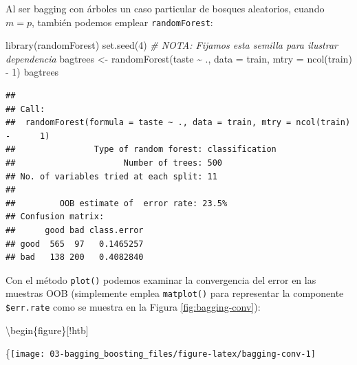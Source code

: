 \documentclass[
  spanish,
]{book}
\newenvironment{Shaded}{\begin{snugshade}}{\end{snugshade}}
\newcommand{\AttributeTok}[1]{\textcolor[rgb]{0.77,0.63,0.00}{#1}}
\newcommand{\CommentTok}[1]{\textcolor[rgb]{0.56,0.35,0.01}{\textit{#1}}}
\newcommand{\DecValTok}[1]{\textcolor[rgb]{0.00,0.00,0.81}{#1}}
\newcommand{\FunctionTok}[1]{\textcolor[rgb]{0.00,0.00,0.00}{#1}}
\newcommand{\NormalTok}[1]{#1}
\newcommand{\OtherTok}[1]{\textcolor[rgb]{0.56,0.35,0.01}{#1}}
\newcommand{\SpecialCharTok}[1]{\textcolor[rgb]{0.00,0.00,0.00}{#1}}
\newcommand{\StringTok}[1]{\textcolor[rgb]{0.31,0.60,0.02}{#1}}
\theoremstyle{break}
\theoremstyle{definition}
\theoremstyle{definition}
\theoremstyle{definition}
\theoremstyle{definition}
\theoremstyle{remark}
\begin{document}
Al ser bagging con árboles un caso particular de bosques aleatorios, cuando \(m = p\), también podemos emplear \texttt{randomForest}:

\begin{Shaded}
\begin{Highlighting}[]
\FunctionTok{library}\NormalTok{(randomForest)}
\FunctionTok{set.seed}\NormalTok{(}\DecValTok{4}\NormalTok{) }\CommentTok{\# NOTA: Fijamos esta semilla para ilustrar dependencia}
\NormalTok{bagtrees }\OtherTok{\textless{}{-}} \FunctionTok{randomForest}\NormalTok{(taste }\SpecialCharTok{\textasciitilde{}}\NormalTok{ ., }\AttributeTok{data =}\NormalTok{ train, }\AttributeTok{mtry =} \FunctionTok{ncol}\NormalTok{(train) }\SpecialCharTok{{-}} \DecValTok{1}\NormalTok{)}
\NormalTok{bagtrees}
\end{Highlighting}
\end{Shaded}

\begin{verbatim}
## 
## Call:
##  randomForest(formula = taste ~ ., data = train, mtry = ncol(train) -      1) 
##                Type of random forest: classification
##                      Number of trees: 500
## No. of variables tried at each split: 11
## 
##         OOB estimate of  error rate: 23.5%
## Confusion matrix:
##      good bad class.error
## good  565  97   0.1465257
## bad   138 200   0.4082840
\end{verbatim}

Con el método \texttt{plot()} podemos examinar la convergencia del error en las muestras OOB (simplemente emplea \texttt{matplot()} para representar la componente \texttt{\$err.rate} como se muestra en la Figura \ref{fig:bagging-conv}):

\begin{Shaded}
\end{Shaded}

\textbackslash begin\{figure\}{[}!htb{]}

\{\centering \texttt{[image: 03-bagging\_boosting\_files/figure-latex/bagging-conv-1]}
\end{document}
